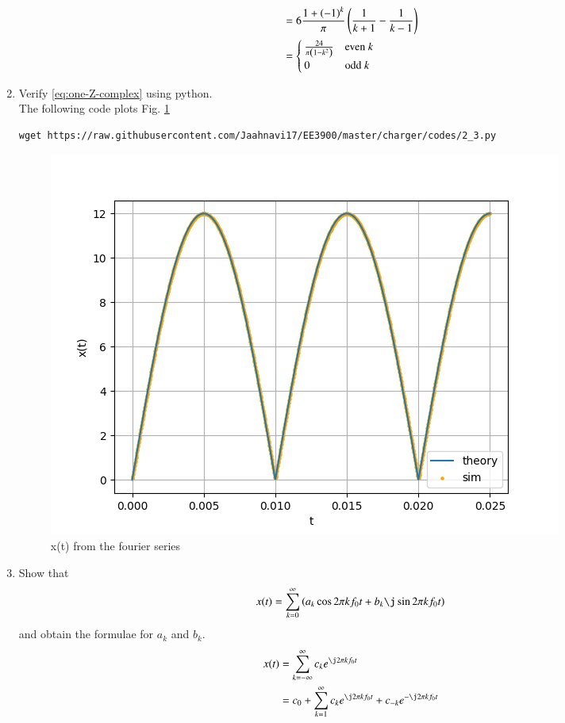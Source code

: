 \documentclass[journal,12pt,twocolumn]{IEEEtran}
\renewcommand\thesection{\arabic{section}}
\begin{document}
\begin{enumerate}[label=\thesection.\arabic*,ref=\thesection.\theenumi]
\begin{align}
        &= 6\frac{1+\left(-1\right)^k}{\pi}\left(\frac{1}{k+1} - \frac{1}{k-1}\right) \\
        &= 
        \begin{cases}
            \frac{24}{\pi\left(1-k^2\right)} & \text{even}\ k \\
            0 &  \text{odd} \ k
        \end{cases}
	\end{align}
\item Verify 
	\eqref{eq:one-Z-complex}
	using python.\\\solution The following code plots Fig. \ref{fig:xt-sim}
	\begin{lstlisting}
wget https://raw.githubusercontent.com/Jaahnavi17/EE3900/master/charger/codes/2_3.py
\end{lstlisting}
	\begin{figure}[h!]
	    \centering
	    \includegraphics[width=\columnwidth]{figures/xt-sim.png}
	    \caption{x(t) from the fourier series}
	    \label{fig:xt-sim}
	\end{figure}
	\item Show that 
\begin{align}
	x(t) = \sum_{k = 0}^{\infty}\brak{a_k\cos{2\pi kf_0 t}+b_k\j\sin{2\pi kf_0 t}}
\label{eq:one-Z-real}
\end{align}
and obtain the formulae for $a_k$ and $b_k$.
\\\solution
\begin{align}
    x(t) &= \sum_{k = -\infty}^{\infty}c_ke^{\j2\pi kf_0 t} \\
         &= c_0 + \sum_{k = 1}^{\infty}c_ke^{\j2\pi kf_0t} + c_{-k}e^{-\j2\pi kf_0t} \\

\end{align}
\end{enumerate}
\end{document}
